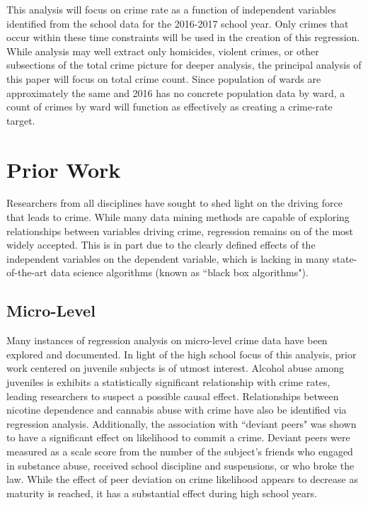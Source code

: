 \documentclass[12pt]{article}
\begin{document}
\par

This analysis will focus on crime rate as a function of independent variables identified from the school data for the 2016-2017 school year.  Only crimes that occur within these time constraints will be used in the creation of this regression.  While analysis may well extract only homicides, violent crimes, or other subsections of the total crime picture for deeper analysis, the principal analysis of this paper will focus on total crime count.  Since population of wards are approximately the same and 2016 has no concrete population data by ward, a count of crimes by ward will function as effectively as creating a crime-rate target.

	\section{Prior Work}

Researchers from all disciplines have sought to shed light on the driving force that leads to crime.  While many data mining methods are capable of exploring relationships between variables driving crime, regression remains on of the most widely accepted.\cite{kaur}  This is in part due to the clearly defined effects of the independent variables on the dependent variable, which is lacking in many state-of-the-art data science algorithms (known as ``black box algorithms").

\subsection{Micro-Level}

Many instances of regression analysis on micro-level crime data have been explored and documented.  In light of the high school focus of this analysis, prior work centered on juvenile subjects is of utmost interest.  Alcohol abuse among juveniles is exhibits a statistically significant relationship with crime rates, leading researchers to suspect a possible causal effect.\cite{fergusson}  Relationships between nicotine dependence and cannabis abuse with crime have also be identified via regression analysis.\cite{ferg2}  Additionally, the association with ``deviant peers" was shown to have a significant effect on likelihood to commit a crime.  Deviant peers were measured as a scale score from the number of the subject's friends who engaged in substance abuse, received school discipline and suspensions, or who broke the law.  While the effect of peer deviation on crime likelihood appears to decrease as maturity is reached, it has a substantial effect during high school years.\cite{ferg2}
\end{document}
